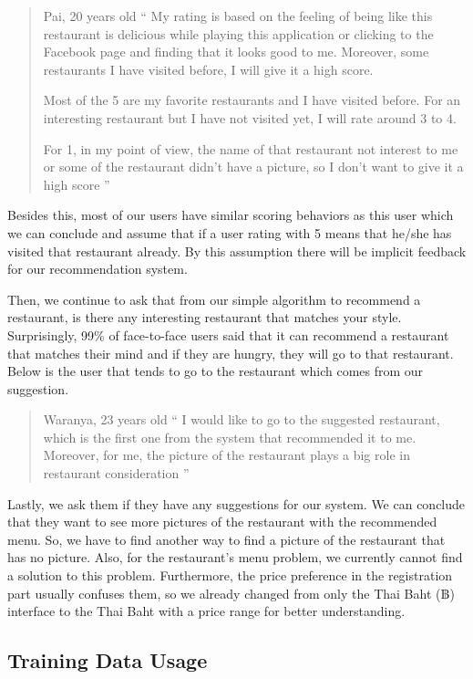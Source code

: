 \documentclass[12pt,oneside,openright,a4paper]{cpe-english-project}
\begin{document}
\begin{quote}{Pai, 20 years old}
“ My rating is based on the feeling of being like this restaurant is delicious while playing this application or clicking to the Facebook page and finding that it looks good to me. Moreover, some restaurants I have visited before, I will give it a high score.

Most of the 5 are my favorite restaurants and I have visited before. For an interesting restaurant but I have not visited yet, I will rate around 3 to 4.

For 1, in my point of view, the name of that restaurant not interest to me or some of the restaurant didn’t have a picture, so I don’t want to give it a high score ”
\end{quote}

Besides this, most of our users have similar scoring behaviors as this user which we can conclude and assume that if a user rating with 5 means that he/she has visited that restaurant already. By this assumption there will be implicit feedback for our recommendation system.

Then, we continue to ask that from our simple algorithm to recommend a restaurant, is there any interesting restaurant that matches your style. Surprisingly, 99\% of face-to-face users said that it can recommend a restaurant that matches their mind and if they are hungry, they will go to that restaurant. Below is the user that tends to go to the restaurant which comes from our suggestion.

\begin{quote}{Waranya, 23 years old}
“ I would like to go to the suggested restaurant, which is the first one from the system that recommended it to me. Moreover, for me, the picture of the restaurant plays a big role in restaurant consideration ”
\end{quote}

Lastly, we ask them if they have any suggestions for our system. We can conclude that they want to see more pictures of the restaurant with the recommended menu. So, we have to find another way to find a picture of the restaurant that has no picture. Also, for the restaurant’s menu problem, we currently cannot find a solution to this problem. Furthermore, the price preference in the registration part usually confuses them, so we already changed from only the Thai Baht ({\thaifont ฿}) interface to the Thai Baht with a price range for better understanding.

\subsection{Training Data Usage}
\end{document}
